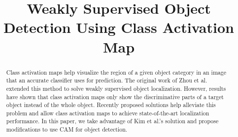 \documentclass[conference]{IEEEtran}
\begin{document}
\title{Weakly Supervised Object Detection Using Class Activation Map\\
}

\author{
    \and
    \and
    \and
}


\maketitle

\begin{abstract}
    Class activation maps help visualize the region of a given object category in an image that an accurate classifier uses for prediction. The original work of Zhou et al. \cite{zhou2015cnnlocalization} extended this method to solve weakly supervised object localization. However, results have shown that class activation maps only show the discriminative parts of a target object instead of the whole object. Recently proposed solutions help alleviate this problem and allow class activation maps to achieve state-of-the-art localization performance. In this paper, we take advantage of Kim et al.'s \cite{kim2022bridging} solution and propose modifications to use CAM for object detection.
\end{abstract}
\end{document}

